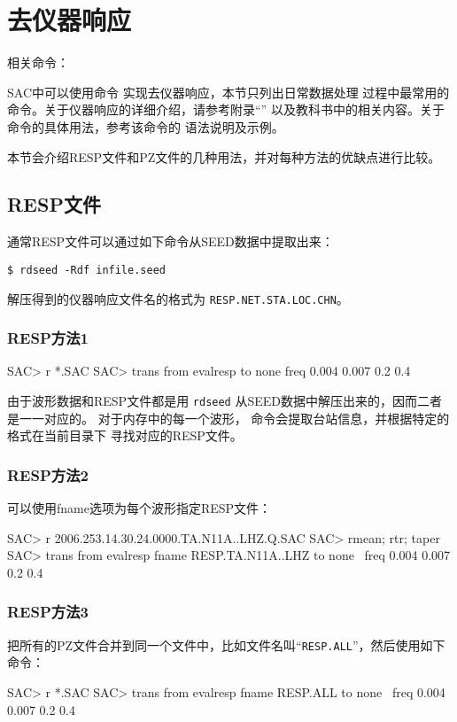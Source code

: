 \section{去仪器响应}
\label{sec:instrument-response}
相关命令：

SAC中可以使用命令  实现去仪器响应，本节只列出日常数据处理
过程中最常用的命令。关于仪器响应的详细介绍，请参考附录``''
以及教科书中的相关内容。关于  命令的具体用法，参考该命令的
语法说明及示例。

本节会介绍RESP文件和PZ文件的几种用法，并对每种方法的优缺点进行比较。
\subsection{RESP文件}
通常RESP文件可以通过如下命令从SEED数据中提取出来：
\begin{verbatim}
$ rdseed -Rdf infile.seed
\end{verbatim}
解压得到的仪器响应文件名的格式为 \texttt{RESP.NET.STA.LOC.CHN}。

\subsubsection{RESP方法1}
\begin{SACCode}
SAC> r *.SAC
SAC> trans from evalresp to none freq 0.004 0.007 0.2 0.4
\end{SACCode}
由于波形数据和RESP文件都是用 \texttt{rdseed} 从SEED数据中解压出来的，因而二者是一一对应的。
对于内存中的每一个波形， 命令会提取台站信息，并根据特定的格式在当前目录下
寻找对应的RESP文件。

\subsubsection{RESP方法2}
可以使用fname选项为每个波形指定RESP文件：
\begin{SACCode}
SAC> r 2006.253.14.30.24.0000.TA.N11A..LHZ.Q.SAC
SAC> rmean; rtr; taper
SAC> trans from evalresp fname RESP.TA.N11A..LHZ to none \
                                freq 0.004 0.007 0.2 0.4
\end{SACCode}

\subsubsection{RESP方法3}
把所有的PZ文件合并到同一个文件中，比如文件名叫``\texttt{RESP.ALL}''，然后使用如下命令：
\begin{SACCode}
SAC> r *.SAC
SAC> trans from evalresp fname RESP.ALL to none \
                            freq 0.004 0.007 0.2 0.4
\end{SACCode}

